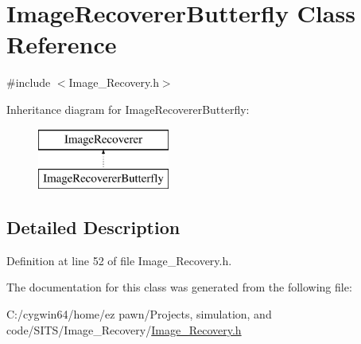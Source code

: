 \hypertarget{class_image_recoverer_butterfly}{}\section{Image\+Recoverer\+Butterfly Class Reference}
\label{class_image_recoverer_butterfly}


{\ttfamily \#include $<$Image\+\_\+\+Recovery.\+h$>$}

Inheritance diagram for Image\+Recoverer\+Butterfly\+:\begin{figure}[H]
\begin{center}
\leavevmode
\includegraphics[height=2.000000cm]{class_image_recoverer_butterfly}
\end{center}
\end{figure}


\subsection{Detailed Description}


Definition at line 52 of file Image\+\_\+\+Recovery.\+h.



The documentation for this class was generated from the following file\+:\begin{DoxyCompactItemize}
\item 
C\+:/cygwin64/home/ez pawn/\+Projects, simulation, and code/\+S\+I\+T\+S/\+Image\+\_\+\+Recovery/\hyperlink{_image___recovery_8h}{Image\+\_\+\+Recovery.\+h}\end{DoxyCompactItemize}
